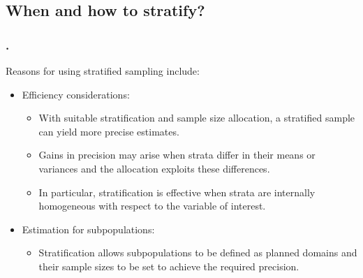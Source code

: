 \documentclass{my_eth_beamer}
\numberwithin{equation}{section}
\begin{document}
\subsection{When and how to stratify?}\label{sec:strat_zweck}

\begin{frame}
    \frametitle{\insertsectionnumber.\insertsubsectionnumber~\insertsubsection}
    Reasons for using stratified sampling include:
    \vspace{0.25em}
    \begin{itemize}
    \setlength{\itemsep}{8pt}
        \item \alert{Efficiency considerations:}
            \begin{itemize}
            \setlength{\itemsep}{4pt}
                \item With suitable stratification and sample size allocation,
                    a stratified sample can yield \alert{more precise}
                    estimates.
                \item Gains in precision may arise when strata differ in their
                    \alert{means} or \alert{variances} and the allocation
                    exploits these differences.
                \item In particular, stratification is effective when strata
                    are internally \alert{homogeneous} with respect to the
                    variable of interest.
            \end{itemize}
        \item \alert{Estimation for subpopulations:}
            \begin{itemize}
            \setlength{\itemsep}{4pt}
                \item Stratification allows subpopulations to be defined as
                    \alert{planned domains} and their sample sizes to be set
                    to achieve the required precision.
            \end{itemize}
    \end{itemize}
\end{frame}
\end{document}
